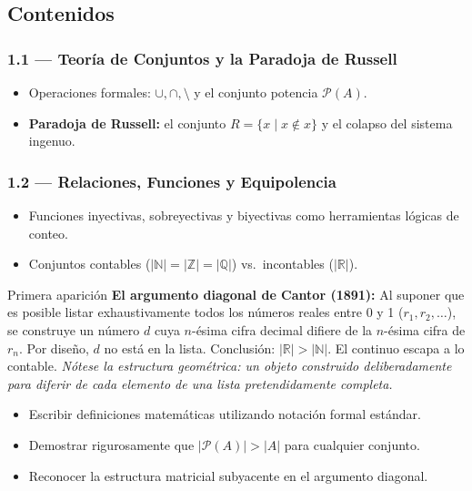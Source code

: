 \documentclass[11pt, letterpaper]{article}
\begin{document}
\subsection{Contenidos}

\subsubsection{1.1 --- Teor\'ia de Conjuntos y la Paradoja de Russell}
\begin{itemize}
  \item Operaciones formales: $\cup, \cap, \setminus$ y el conjunto potencia $\mathcal{P}(A)$.
  \item \textbf{Paradoja de Russell:} el conjunto $R=\{x \mid x\notin x\}$ y el colapso del sistema ingenuo.
\end{itemize}

\subsubsection{1.2 --- Relaciones, Funciones y Equipolencia}
\begin{itemize}
  \item Funciones inyectivas, sobreyectivas y biyectivas como herramientas l\'ogicas de conteo.
  \item Conjuntos contables ($|\mathbb{N}|=|\mathbb{Z}|=|\mathbb{Q}|$) vs.\ incontables ($|\mathbb{R}|$).
\end{itemize}

\begin{diagonal}{Primera aparici\'on}
\textbf{El argumento diagonal de Cantor (1891):} Al suponer que es posible listar exhaustivamente todos los n\'umeros reales entre 0 y 1 ($r_1, r_2, \ldots$), se construye un n\'umero $d$ cuya $n$-\'esima cifra decimal difiere de la $n$-\'esima cifra de $r_n$.
Por dise\~no, $d$ no est\'a en la lista. Conclusi\'on: $|\mathbb{R}|>|\mathbb{N}|$. El continuo escapa a lo contable.
\medskip
\textit{N\'otese la estructura geom\'etrica: un objeto construido deliberadamente para diferir de cada elemento de una lista pretendidamente completa.}
\end{diagonal}

\begin{objetivos}
\begin{itemize}
  \item Escribir definiciones matem\'aticas utilizando notaci\'on formal est\'andar.
  \item Demostrar rigurosamente que $|\mathcal{P}(A)|>|A|$ para cualquier conjunto.
  \item Reconocer la estructura matricial subyacente en el argumento diagonal.
\end{itemize}
\end{objetivos}
\end{document}
